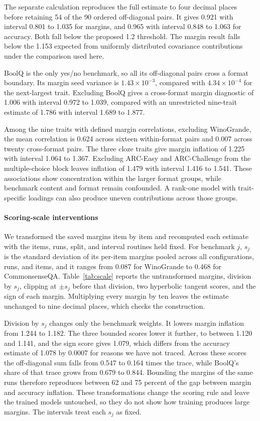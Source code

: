 The separate calculation reproduces the full estimate to four decimal places before retaining 54 of the 90 ordered off-diagonal pairs. It gives 0.921 with interval 0.801 to 1.035 for margins, and 0.965 with interval 0.848 to 1.063 for accuracy. Both fall below the proposed 1.2 threshold. The margin result falls below the 1.153 expected from uniformly distributed covariance contributions under the comparison used here.

BoolQ is the only yes/no benchmark, so all its off-diagonal pairs cross a format boundary. Its margin seed variance is $1.43\times10^{-3}$, compared with $4.34\times10^{-4}$ for the next-largest trait. Excluding BoolQ gives a cross-format margin diagnostic of 1.006 with interval 0.972 to 1.039, compared with an unrestricted nine-trait estimate of 1.786 with interval 1.689 to 1.877.

Among the nine traits with defined margin correlations, excluding WinoGrande, the mean correlation is 0.624 across sixteen within-format pairs and 0.007 across twenty cross-format pairs. The three cloze traits give margin inflation of 1.225 with interval 1.064 to 1.367. Excluding ARC-Easy and ARC-Challenge from the multiple-choice block leaves inflation of 1.479 with interval 1.416 to 1.541. These associations show concentration within the larger format groups, while benchmark content and format remain confounded. A rank-one model with trait-specific loadings can also produce uneven contributions across those groups.

\paragraph{Scoring-scale interventions}
\label{app:scale}
We transformed the saved margins item by item and recomputed each estimate with the items, runs, split, and interval routines held fixed. For benchmark $j$, $s_j$ is the standard deviation of its per-item margins pooled across all configurations, runs, and items, and it ranges from 0.087 for WinoGrande to 0.468 for CommonsenseQA. Table~\ref{tab:scale} reports the untransformed margins, division by $s_j$, clipping at $\pm s_j$ before that division, two hyperbolic tangent scores, and the sign of each margin. Multiplying every margin by ten leaves the estimate unchanged to nine decimal places, which checks the construction.

Division by $s_j$ changes only the benchmark weights. It lowers margin inflation from 1.244 to 1.182. The three bounded scores lower it further, to between 1.120 and 1.141, and the sign score gives 1.079, which differs from the accuracy estimate of 1.078 by 0.0007 for reasons we have not traced. Across these scores the off-diagonal sum falls from 0.547 to 0.164 times the trace, while BoolQ's share of that trace grows from 0.679 to 0.844. Bounding the margins of the same runs therefore reproduces between 62 and 75 percent of the gap between margin and accuracy inflation. These transformations change the scoring rule and leave the trained models untouched, so they do not show how training produces large margins. The intervals treat each $s_j$ as fixed.

